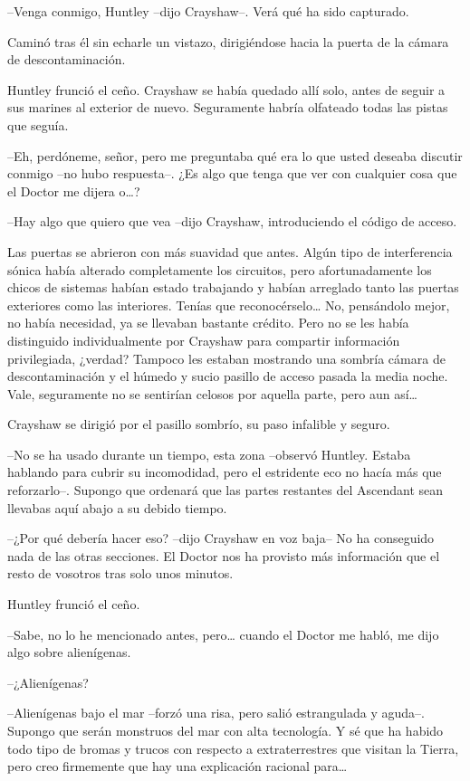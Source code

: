 {--Venga conmigo, Huntley --dijo Crayshaw--. Verá qué ha sido
capturado.}

{Caminó tras él sin echarle un vistazo, dirigiéndose hacia la puerta de
la cámara de descontaminación.}

{Huntley frunció el ceño. Crayshaw se había quedado allí solo, antes de
 seguir a sus marines al exterior de nuevo. Seguramente habría olfateado
todas las pistas que seguía.}

{--Eh, perdóneme, señor, pero me preguntaba qué era lo que usted deseaba
 discutir conmigo --no hubo respuesta--. ¿Es algo que tenga que ver con
 cualquier cosa que el Doctor me dijera o\ldots{}?}

{--Hay algo que quiero que vea --dijo Crayshaw, introduciendo el código
de acceso.}

{Las puertas se abrieron con más suavidad que antes. Algún tipo de
 interferencia sónica había alterado completamente los circuitos, pero
 afortunadamente los chicos de sistemas habían estado trabajando y habían
 arreglado tanto las puertas exteriores como las interiores. Tenías que
 reconocérselo\ldots{} No, pensándolo mejor, no había necesidad, ya se
 llevaban bastante crédito. Pero no se les había distinguido
 individualmente por Crayshaw para compartir información privilegiada,
 ¿verdad? Tampoco les estaban mostrando una sombría cámara de
 descontaminación y el húmedo y sucio pasillo de acceso pasada la media
 noche. Vale, seguramente no se sentirían celosos por aquella parte, pero
 aun así\ldots{}}

{Crayshaw se dirigió por el pasillo sombrío, su paso infalible y
seguro.}

{--No se ha usado durante un tiempo, esta zona --observó Huntley. Estaba
 hablando para cubrir su incomodidad, pero el estridente eco no hacía más
 que reforzarlo--. Supongo que ordenará que las partes restantes del
Ascendant sean llevabas aquí abajo a su debido tiempo.}

{--¿Por qué debería hacer eso? --dijo Crayshaw en voz baja-- No ha
 conseguido nada de las otras secciones. El Doctor nos ha provisto más
información que el resto de vosotros tras solo unos minutos.}

{Huntley frunció el ceño.}

{--Sabe, no lo he mencionado antes, pero\ldots{} cuando el Doctor me
habló, me dijo algo sobre alienígenas.}

{--¿Alienígenas?}

{--Alienígenas bajo el mar --forzó una risa, pero salió estrangulada y
 aguda--. Supongo que serán monstruos del mar con alta tecnología. Y sé
 que ha habido todo tipo de bromas y trucos con respecto a
 extraterrestres que visitan la Tierra, pero creo firmemente que hay una
 explicación racional para\ldots{}}

